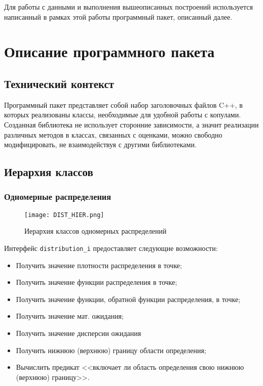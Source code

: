 Для работы с данными и выполнения вышеописанных построений используется написанный в рамках этой работы программный пакет, описанный далее.

\section*{Описание программного пакета}
\subsection*{Технический контекст}

Программный пакет представляет собой набор заголовочных файлов C++, в которых реализованы классы, необходимые для удобной работы с копулами. Созданная библиотека не использует сторонние зависимости, а значит реализации различных методов в классах, связанных с оценками, можно свободно модифицировать, не взаимодействуя с другими библиотеками.

\subsection*{Иерархия классов}

\subsubsection*{Одномерные распределения}

\begin{figure}[H]
	\centering
	\texttt{[image: DIST\_HIER.png]}
	\caption{Иерархия классов одномерных распределений}
\end{figure}

Интерфейс \texttt{distribution\_i} предоставляет следующие возможности:
\begin{itemize}
  \item Получить значение плотности распределения в точке;
  \item Получить значение функции распределения в точке;
  \item Получить значение функции, обратной функции распределения, в точке;

  \item Получить значение мат. ожидания;
  \item Получить значение дисперсии ожидания

  \item Получить нижнюю (верхнюю) границу области определения;

  \item Вычислить предикат <<включает ли область определения свою нижнюю (верхнюю) границу>>.
\end{itemize}

